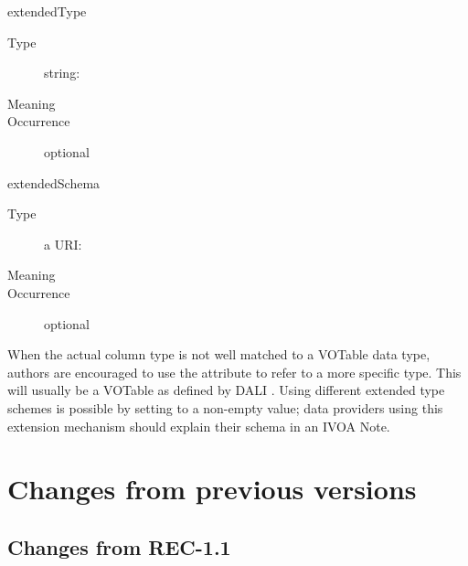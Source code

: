 \documentclass[11pt,a4paper]{ivoa}
\begin{document}
\begin{generated}
\begin{bigdescription}
\begin{description}
\end{description}
\item[extendedType]
\begin{description}
\item[Type] string: 
\item[Meaning] 
\item[Occurrence] optional
\end{description}
\item[extendedSchema]
\begin{description}
\item[Type] a URI: 
\item[Meaning] 
\item[Occurrence] optional
\end{description}


\end{bigdescription}\endgroup

\endgroup
\end{generated}




When the actual column type is not
well matched to a VOTable data type, authors are
encouraged to use the  attribute to refer to
a more specific type.  This will usually be a VOTable  as
defined by DALI \citep{2017ivoa.spec.0517D}.  Using different extended
type schemes is possible by setting  to a
non-empty value; data providers using this extension mechanism should
explain their schema in an IVOA Note.

\appendix

\section{Changes from previous versions}

\subsection{Changes from REC-1.1}
\end{document}
